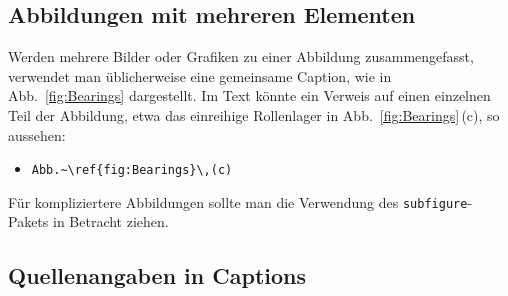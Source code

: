 \subsection{Abbildungen mit mehreren Elementen}

Werden mehrere Bilder oder Grafiken zu einer Abbildung zusammengefasst, 
verwendet man üblicherweise eine gemeinsame Caption, wie in Abb.~\ref{fig:Bearings}
dargestellt. Im Text könnte ein Verweis auf einen einzelnen Teil der Abbildung, etwa das 
einreihige Rollenlager in Abb.~\ref{fig:Bearings}\,(c), so aussehen:
%
\begin{itemize}
\item[] \verb!Abb.~\ref{fig:Bearings}\,(c)! 
\end{itemize}
%
Für kompliziertere Abbildungen sollte man die Verwendung des 
\texttt{subfigure}-Pakets \cite{Cochran95} in Betracht ziehen.


\subsection{Quellenangaben in Captions}
\label{sec:QuellenangabenInCaptions}

